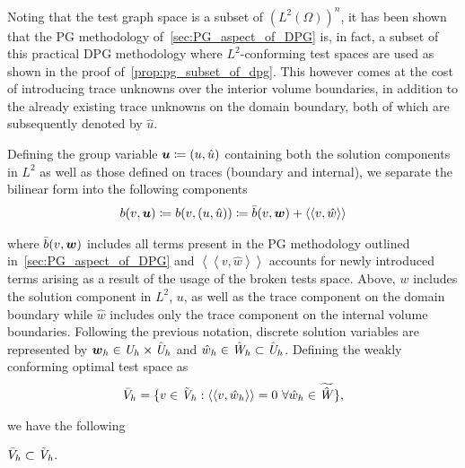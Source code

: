 
Noting that the test graph space is a subset of $(L^2(\Omega))^n$, it has been shown that the PG methodology
of~\autoref{sec:PG_aspect_of_DPG} is, in fact, a subset of this practical DPG methodology where $L^2$-conforming test
spaces are used as shown in the proof of~\autoref{prop:pg_subset_of_dpg}. This however comes at the cost of introducing
trace unknowns over the interior volume boundaries, in addition to the already existing trace unknowns on the domain
boundary, both of which are subsequently denoted by $\hat{u}$.

Defining the group variable $\mathit{\bm{{u}}} \coloneqq (u,\hat{u})$ containing both the solution components in $L^2$ as well as
those defined on traces (boundary and internal),
we separate the bilinear form into the following components
\begin{align} \label{eq:bilinear_decomposition}
b(v,\mathit{\bm{{u}}})
\coloneqq b(v,(u,\hat{u})) \coloneqq \bar{b}(v,\mathit{\bm{{w}}}) + \left<\left< v,\hat{w} \right>\right>
\end{align}

where $\bar{b}(v,\mathit{\bm{{w}}})$ includes all terms present in the PG methodology outlined in~\autoref{sec:PG_aspect_of_DPG} and
$\left<\left< v,\hat{w} \right>\right>$ accounts for newly introduced terms arising as a result of the usage of the
broken tests space. Above, $w$ includes the solution component in $L^2$, $u$, as well as the trace component on the
domain boundary while $\hat{w}$ includes only the trace component on the internal volume boundaries. Following the
previous notation, discrete solution variables are represented by $\mathit{\bm{{w}}}_h \in \mathit{{{U}}}_h \times \hat{\mathit{{{U}}}}_h$ and
$\hat{w}_h \in \hat{\mathit{{{W}}}}_h \subset \hat{\mathit{{{U}}}}_h$. Defining the weakly
conforming optimal test space as
\begin{align} \label{eq:weakly_conforming_approx_test_space}
\bar{V}_h = \{ v \in \tilde{\mathit{{{V}}}}_h : \left<\left< v,\hat{w}_h \right>\right> = 0\ \forall \hat{w}_h \in \widetilde{\hat{\mathit{{{W}}}}} \},
\end{align}

we have the following

\begin{proposition} \label{prop:pg_subset_of_dpg}
$\bar{V}_h \subset \tilde{\mathit{{{V}}}}_h.$
\end{proposition}

